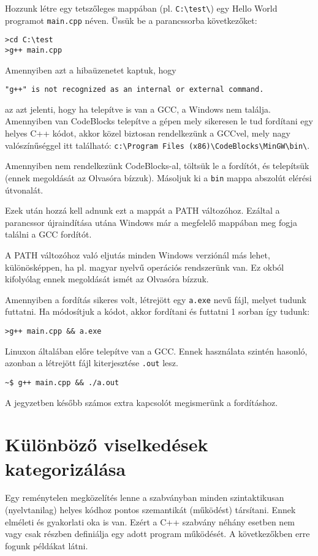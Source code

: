 \documentclass[a4paper,11.5pt,table]{article}
\begin{document}
	Hozzunk létre egy tetszőleges mappában (pl. \texttt{C:\textbackslash test\textbackslash}) egy Hello World programot \texttt{main.cpp} néven. Üssük be a parancssorba következőket:
	\begin{lstlisting}
>cd C:\test
>g++ main.cpp
	\end{lstlisting}
	Amennyiben azt a hibaüzenetet kaptuk, hogy 
	
	{\centering\texttt{"g++" is not recognized as an internal or external command.}\par}
	
	az azt jelenti, hogy ha telepítve is van a GCC, a Windows nem találja. Amennyiben van CodeBlocks telepítve a gépen mely sikeresen le tud fordítani egy helyes C++ kódot, akkor közel biztosan rendelkezünk a GCCvel, mely nagy valószínűséggel itt található: \texttt{c:\textbackslash Program Files (x86)\textbackslash CodeBlocks\textbackslash MinGW\textbackslash bin\textbackslash }.
	 
	Amennyiben nem rendelkezünk CodeBlocks-al, töltsük le a fordítót, és telepítsük (ennek megoldását az Olvasóra bízzuk). Másoljuk ki a \texttt{bin} mappa abszolút elérési útvonalát.
	 
	Ezek után hozzá kell adnunk ezt a mappát a PATH változóhoz. Ezáltal a parancssor újraindítása utána Windows már a megfelelő mappában meg fogja találni a GCC fordítót.
	\begin{note}
	 	A PATH változóhoz való eljutás minden Windows verziónál más lehet, különösképpen, ha pl. magyar nyelvű operációs rendszerünk van. Ez okból kifolyólag ennek megoldását ismét az Olvasóra bízzuk.
	\end{note}
	Amennyiben a fordítás sikeres volt, létrejött egy \texttt{a.exe} nevű fájl, melyet tudunk futtatni. Ha módosítjuk a kódot, akkor fordítani és futtatni 1 sorban így tudunk:
	\begin{lstlisting}
>g++ main.cpp && a.exe
	\end{lstlisting}
	Linuxon általában előre telepítve van a GCC. Ennek használata szintén hasonló, azonban a létrejött fájl kiterjesztése \texttt{.out} lesz.
	\begin{lstlisting}
~$ g++ main.cpp && ./a.out
	\end{lstlisting}
	A jegyzetben később számos extra kapcsolót megismerünk a fordításhoz.

	\section{Különböző viselkedések kategorizálása}
	Egy reménytelen megközelítés lenne a szabványban minden szintaktikusan (nyelvtanilag) helyes kódhoz pontos szemantikát (működést) társítani. Ennek  elméleti és gyakorlati oka is van. Ezért a C++ szabvány néhány esetben nem vagy csak részben definiálja egy adott program működését. A következőkben erre fogunk példákat látni.
\end{document}
